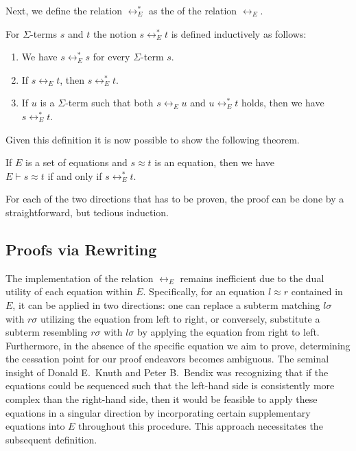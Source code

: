 Next, we define the relation $\leftrightarrow_E^*$ as the  of the relation
$\leftrightarrow_E$.
\begin{Definition}[$\leftrightarrow_E^*$]
  For $\Sigma$-terms $s$ and $t$ the notion $s \leftrightarrow_E^* t$ is defined inductively as follows:
  \begin{enumerate}
  \item We have $s \leftrightarrow_E^* s$ for every $\Sigma$-term $s$.
  \item If $s \leftrightarrow_E t$, then $s \leftrightarrow_E^* t$.
  \item If $u$ is a $\Sigma$-term such that both $s \leftrightarrow_E u$ and $u \leftrightarrow_E^* t$ holds,
        then we have $s \leftrightarrow_E^* t$. \eod
  \end{enumerate}
\end{Definition}

\noindent
Given this definition it is now possible to show the following theorem.

\begin{Theorem}
  If $E$ is a set of equations and $s \approx t$ is an equation, then we have
  \\[0.2cm]
  \hspace*{1.3cm}
  $E \vdash s \approx t$ \quad if and only if \quad $s \leftrightarrow_E^* t$.
\end{Theorem}
For each of the two directions that has to be proven, the proof can be done by a straightforward, but tedious
induction. 

\subsection{Proofs via Rewriting}
The implementation of the relation $\leftrightarrow_E$ remains inefficient due to the dual utility of each
equation within $E$. Specifically, for an equation $l \approx r$ contained in $E$, it can be applied in two
directions: one can replace a subterm matching $l\sigma$ with $r\sigma$ utilizing the equation from left to
right, or conversely, substitute a subterm resembling $r\sigma$ with $l\sigma$ by applying the equation from
right to left. Furthermore, in the absence of the specific equation we aim to prove, determining the cessation
point for our proof endeavors becomes ambiguous. The seminal insight of Donald E.~Knuth and Peter B.~Bendix
\cite{knuth:1970} was recognizing that if the equations could be sequenced such that the left-hand side is
consistently more complex than the right-hand side, then it would be feasible to apply these equations in a
singular direction by incorporating certain supplementary equations into $E$ throughout this procedure. This
approach necessitates the subsequent definition. 


